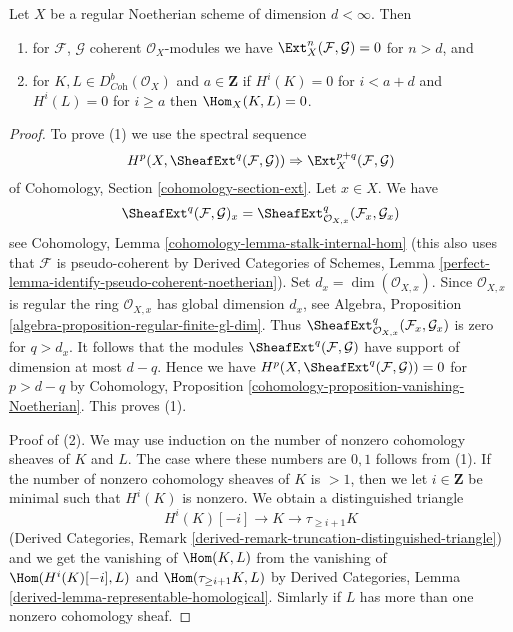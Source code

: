\begin{lemma}
\label{lemma-Ext-0-regular}
Let $X$ be a regular Noetherian scheme of dimension $d < \infty$. Then
\begin{enumerate}
\item for $\mathcal{F}$, $\mathcal{G}$ coherent $\mathcal{O}_X$-modules
we have $\Ext^n_X(\mathcal{F}, \mathcal{G}) = 0$ for $n > d$, and
\item for $K, L \in D^b_{\textit{Coh}}(\mathcal{O}_X)$ and $a \in \mathbf{Z}$
if $H^i(K) = 0$ for $i < a + d$ and $H^i(L) = 0$ for $i \geq a$ then
$\Hom_X(K, L) = 0$.
\end{enumerate}
\end{lemma}

\begin{proof}
To prove (1) we use the spectral sequence
$$
H^p(X, \SheafExt^q(\mathcal{F}, \mathcal{G})) \Rightarrow
\Ext^{p + q}_X(\mathcal{F}, \mathcal{G})
$$
of Cohomology, Section \ref{cohomology-section-ext}. Let $x \in X$.
We have
$$
\SheafExt^q(\mathcal{F}, \mathcal{G})_x =
\SheafExt^q_{\mathcal{O}_{X, x}}(\mathcal{F}_x, \mathcal{G}_x)
$$
see Cohomology, Lemma \ref{cohomology-lemma-stalk-internal-hom}
(this also uses that $\mathcal{F}$ is pseudo-coherent by
Derived Categories of Schemes, Lemma
\ref{perfect-lemma-identify-pseudo-coherent-noetherian}).
Set $d_x = \dim(\mathcal{O}_{X, x})$.
Since $\mathcal{O}_{X, x}$ is regular the ring
$\mathcal{O}_{X, x}$ has global dimension $d_x$, see
Algebra, Proposition \ref{algebra-proposition-regular-finite-gl-dim}.
Thus $\SheafExt^q_{\mathcal{O}_{X, x}}(\mathcal{F}_x, \mathcal{G}_x)$
is zero for $q > d_x$. It follows that the modules
$\SheafExt^q(\mathcal{F}, \mathcal{G})$ have support
of dimension at most $d - q$. Hence we have
$H^p(X, \SheafExt^q(\mathcal{F}, \mathcal{G})) = 0$ for $p > d - q$
by Cohomology, Proposition \ref{cohomology-proposition-vanishing-Noetherian}.
This proves (1).

\medskip\noindent
Proof of (2).
We may use induction on the number of nonzero cohomology sheaves
of $K$ and $L$. The case where these numbers are $0, 1$ follows
from (1). If the number of nonzero cohomology sheaves of $K$
is $> 1$, then we let $i \in \mathbf{Z}$ be minimal such that
$H^i(K)$ is nonzero. We obtain a distinguished triangle
$$
H^i(K)[-i] \to K \to \tau_{\geq i + 1}K
$$
(Derived Categories, Remark
\ref{derived-remark-truncation-distinguished-triangle})
and we get the vanishing of $\Hom(K, L)$ from the vanishing
of $\Hom(H^i(K)[-i], L)$ and $\Hom(\tau_{\geq i + 1}K, L)$
by Derived Categories, Lemma \ref{derived-lemma-representable-homological}.
Simlarly if $L$ has more than one nonzero cohomology sheaf.
\end{proof}

